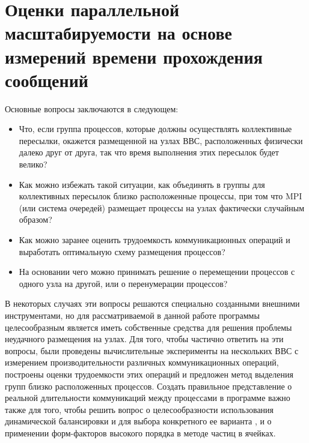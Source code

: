 		
        \section{Оценки параллельной масштабируемости на основе измерений времени прохождения сообщений}
        
        Основные вопросы заключаются в следующем:
        \begin{itemize} 
        \item Что, если группа процессов, которые должны осуществлять коллективные пересылки, окажется размещенной на узлах ВВС, расположенных физически далеко друг от друга, так что время выполнения этих пересылок будет велико?
        \item Как можно избежать такой ситуации, как объединять в группы для коллективных пересылок близко расположенные процессы, при том что MPI (или система очередей) размещает процессы на узлах фактически случайным образом? 
        \item Как можно заранее оценить трудоемкость коммуникационных операций и выработать оптимальную схему размещения процессов? 
        \item На основании чего можно принимать решение о перемещении процессов с одного узла на другой, или о перенумерации процессов?
        \end{itemize} 
        В некоторых случаях эти вопросы решаются специально созданными внешними инструментами, но для рассматриваемой в данной работе программы целесообразным является иметь собственные средства для решения проблемы неудачного размещения на узлах.
        Для того, чтобы частично ответить на эти вопросы, были проведены вычислительные эксперименты на нескольких ВВС с измерением производительности различных коммуникационных операций, построены оценки трудоемкости этих операций и предложен метод выделения групп близко расположенных процессов. Создать правильное представление о реальной длительности коммуникаций между процессами в программе важно также для того, чтобы решить вопрос о целесообразности использования динамической балансировки и для выбора конкретного ее варианта , и о применении форм-факторов высокого порядка в методе частиц в ячейках. 
        
